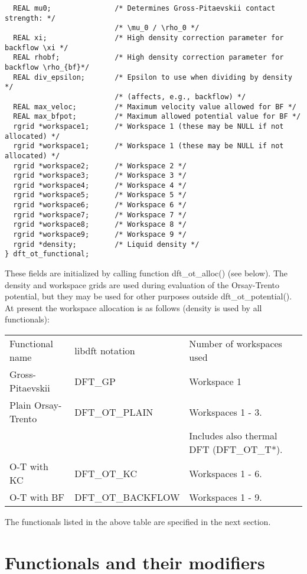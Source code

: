 \documentclass[12pt,letterpaper]{report}
\begin{document}
\begin{verbatim}
  REAL mu0;               /* Determines Gross-Pitaevskii contact strength: */
                          /* \mu_0 / \rho_0 */
  REAL xi;                /* High density correction parameter for backflow \xi */
  REAL rhobf;             /* High density correction parameter for backflow \rho_{bf}*/
  REAL div_epsilon;       /* Epsilon to use when dividing by density */
                          /* (affects, e.g., backflow) */
  REAL max_veloc;         /* Maximum velocity value allowed for BF */
  REAL max_bfpot;         /* Maximum allowed potential value for BF */
  rgrid *workspace1;      /* Workspace 1 (these may be NULL if not allocated) */
  rgrid *workspace1;      /* Workspace 1 (these may be NULL if not allocated) */
  rgrid *workspace2;      /* Workspace 2 */
  rgrid *workspace3;      /* Workspace 3 */
  rgrid *workspace4;      /* Workspace 4 */
  rgrid *workspace5;      /* Workspace 5 */
  rgrid *workspace6;      /* Workspace 6 */
  rgrid *workspace7;      /* Workspace 7 */
  rgrid *workspace8;      /* Workspace 8 */
  rgrid *workspace9;      /* Workspace 9 */
  rgrid *density;         /* Liquid density */
} dft_ot_functional;
\end{verbatim}

\noindent
These fields are initialized by calling function dft\_ot\_alloc() (see below). The density and workspace grids are used during evaluation of the Orsay-Trento potential, but they may be used for other purposes outside dft\_ot\_potential(). At present the workspace allocation is as follows (density is used by all functionals):

\begin{tabular}{lll}
Functional name & libdft notation & Number of workspaces used\\
\cline{1-3}
Gross-Pitaevskii & DFT\_GP & Workspace 1\\
Plain Orsay-Trento & DFT\_OT\_PLAIN & Workspaces 1 - 3.\\
 & & Includes also thermal DFT (DFT\_OT\_T*).\\
O-T with KC & DFT\_OT\_KC & Workspaces 1 - 6.\\
O-T with BF & DFT\_OT\_BACKFLOW & Workspaces 1 - 9.\\
\end{tabular}

\noindent
The functionals listed in the above table are specified in the next section.

\section{Functionals and their modifiers}
\end{document}
